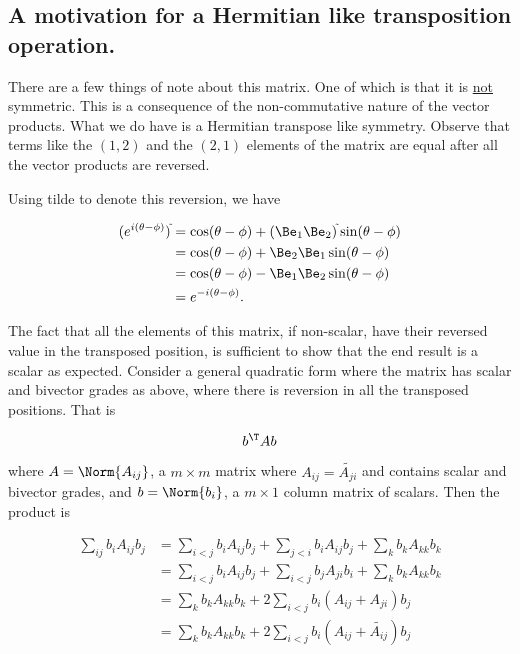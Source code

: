 \subsection{A motivation for a Hermitian like transposition operation.}

There are a few things of note about this matrix.  One of which is that it is \underline{not} symmetric.  This is a consequence of the non-commutative nature of the vector products.  What we do have is a Hermitian transpose like symmetry.  Observe that terms like the $(1,2)$ and the $(2,1)$ elements of the matrix are equal after all the vector products are reversed.

Using tilde to denote this reversion, we have

\begin{align*}
(e^{i (\theta - \phi)})^{\tilde{}}
&=
\cos(\theta - \phi)
+ (\Be_1 \Be_2)^{\tilde{}}
\sin(\theta - \phi) \\
&=
\cos(\theta - \phi)
+ \Be_2 \Be_1
\sin(\theta - \phi) \\
&=
\cos(\theta - \phi)
- \Be_1 \Be_2 
\sin(\theta - \phi) \\
&=
e^{-i (\theta -\phi)}.
\end{align*}

The fact that all the elements of this matrix, if non-scalar, have their reversed value in the transposed position, is sufficient to show that the end result is a scalar as expected.  Consider a general quadratic form where the matrix has scalar and bivector grades as above, where there is reversion in all the transposed positions.  That is

\begin{equation}\label{eqn:matrixVectorPotentials:n}
b^\T A b
\end{equation}

where $A = \Norm{A_{ij}}$, a $m \times m$ matrix where $A_{ij} = \tilde{A_{ji}}$ and contains scalar and bivector grades, and $b = \Norm{b_i}$, a $m\times 1$ column matrix of scalars.  Then the product is

\begin{align*}
\sum_{ij} b_i A_{ij} b_j
&=
\sum_{i<j} b_i A_{ij} b_j
+\sum_{j<i} b_i A_{ij} b_j
+\sum_{k} b_k A_{kk} b_k \\
&=
\sum_{i<j} b_i A_{ij} b_j
+\sum_{i<j} b_{j} A_{ji} b_i
+\sum_{k} b_k A_{kk} b_k \\
&=
\sum_{k} b_k A_{kk} b_k + 2 \sum_{i<j} b_i (A_{ij} + A_{ji}) b_j \\
&=
\sum_{k} b_k A_{kk} b_k + 2 \sum_{i<j} b_i (A_{ij} + \tilde{A_{ij}}) b_j
\end{align*}

